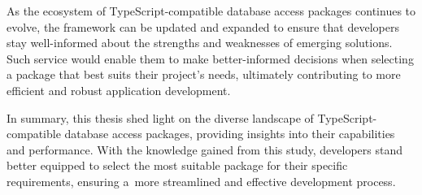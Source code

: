 As the ecosystem of TypeScript-compatible database access packages continues to
evolve, the framework can be updated and expanded to ensure that developers stay
well-informed about the strengths and weaknesses of emerging solutions. Such
service would enable them to make better-informed decisions when selecting a
package that best suits their project's needs, ultimately contributing to more
efficient and robust application development.

In summary, this thesis shed light on the diverse landscape of
TypeScript-compatible database access packages, providing insights into their
capabilities and performance. With the knowledge gained from this study,
developers stand better equipped to select the most suitable package for their
specific requirements, ensuring a~more streamlined and effective development
process.
